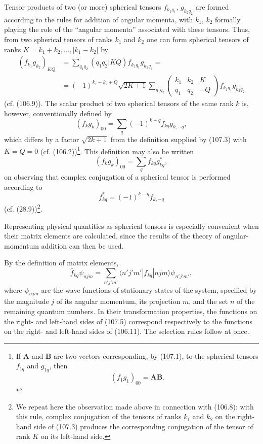 Tensor products of two (or more) spherical tensors $f_{k_1q_1}$, $g_{k_2q_2}$ are formed according to the rules for addition of angular momenta, with $k_1$, $k_2$ formally playing the role of the ``angular momenta'' associated with these tensors. Thus, from two spherical tensors of ranks $k_1$ and $k_2$ one can form spherical tensors of ranks $K=k_1+k_2,\ldots,|k_1-k_2|$ by
\begin{equation}
 \begin{aligned}
 (f_{k_1}g_{k_2})_{KQ}&=\sum_{q_1q_2}(q_1q_2|KQ)f_{k_1q_1}g_{k_2q_2}=\\
 &=(-1)^{k_1-k_2+Q}\sqrt{2K+1}\sum_{q_1q_2}
 \begin{pmatrix}k_1&k_2&K\\q_1&q_2&-Q\end{pmatrix}f_{k_1q_1}g_{k_2q_2}
 \end{aligned}
 \tag{107.3}
\end{equation}
(cf. (106.9)). The scalar product of two spherical tensors of the same rank $k$ is, however, conventionally defined by
\begin{equation}
 (f_kg_k)_{00}=\sum_q(-1)^{k-q}f_{kq}g_{k,-q},
 \tag{107.4}
\end{equation}
which differs by a factor $\sqrt{2k+1}$ from the definition supplied by (107.3) with $K=Q=0$ (cf. (106.2))\footnote{If $\mathbf A$ and $\mathbf B$ are two vectors corresponding, by (107.1), to the spherical tensors $f_{1q}$ and $g_{1q}$, then
\[
 (f_1g_1)_{00}=\mathbf{AB}.
\]}. This definition may also be written
\[
 (f_kg_k)_{00}=\sum_q f_{kq}g_{kq}^{*},
\]
on observing that complex conjugation of a spherical tensor is performed according to
\[
 f_{kq}^{*}=(-1)^{k-q}f_{k,-q}
\]
(cf. (28.9))\footnote{We repeat here the observation made above in connection with (106.8): with this rule, complex conjugation of the tensors of ranks $k_1$ and $k_2$ on the right-hand side of (107.3) produces the corresponding conjugation of the tensor of rank $K$ on its left-hand side.}.

Representing physical quantities as spherical tensors is especially convenient when their matrix elements are calculated, since the results of the theory of angular-momentum addition can then be used.

By the definition of matrix elements,
\begin{equation}
 \widehat f_{kq}\psi_{njm}=\sum_{n'j'm'}\langle n'j'm'|f_{kq}|njm\rangle\psi_{n'j'm'},
 \tag{107.5}
\end{equation}
where $\psi_{njm}$ are the wave functions of stationary states of the system, specified by the magnitude $j$ of its angular momentum, its projection $m$, and the set $n$ of the remaining quantum numbers. In their transformation properties, the functions on the right- and left-hand sides of (107.5) correspond respectively to the functions on the right- and left-hand sides of (106.11). The selection rules follow at once.

